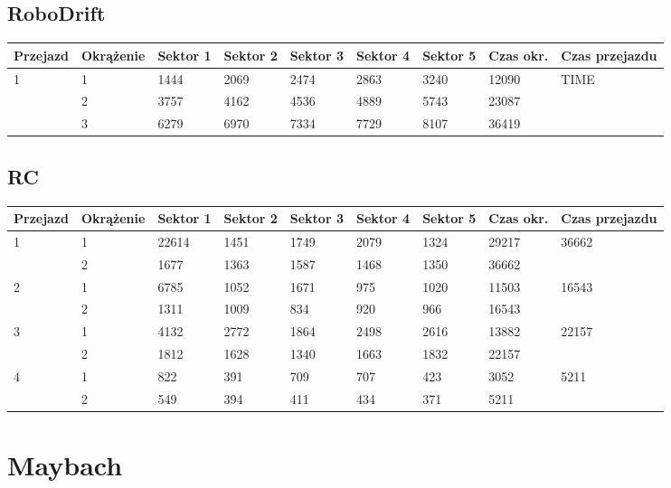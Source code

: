 \documentclass[11pt]{article}
\begin{document}
\subsection{RoboDrift}
\begin{table}[h]
\begin{tabular}{|l|l|l|l|l|l|l|l|l|}
\hline
   Przejazd        & Okrążenie & Sektor 1 & Sektor 2 & Sektor 3 & Sektor 4 & Sektor 5 & Czas okr. & Czas przejazdu    \\ \hline
\multirow{3}{*}{1}& 1 &1444& 2069& 2474& 2863& 3240& 12090& \multirow{3}{*}{TIME} \\ \cline{2-8}
& 2& 3757& 4162& 4536& 4889& 5743& 23087& \\ \cline{2-8}
& 3& 6279& 6970& 7334& 7729& 8107& 36419& \\ \hline
\end{tabular}
\end{table}
\subsection{RC}
\begin{table}[h]
\begin{tabular}{|l|l|l|l|l|l|l|l|l|}
\hline
 Przejazd        & Okrążenie & Sektor 1 & Sektor 2 & Sektor 3 & Sektor 4 & Sektor 5 & Czas okr. & Czas przejazdu    \\ \hline
\multirow{2}{*}{1}& 1 &22614& 1451& 1749& 2079& 1324& 29217& \multirow{2}{*}{36662} \\ \cline{2-8}
& 2& 1677& 1363& 1587& 1468& 1350& 36662& \\ \hline
\multirow{2}{*}{2}& 1 &6785& 1052& 1671& 975& 1020& 11503& \multirow{2}{*}{16543} \\ \cline{2-8}
& 2& 1311& 1009& 834& 920& 966& 16543& \\ \hline
\multirow{2}{*}{3}& 1 &4132& 2772& 1864& 2498& 2616& 13882& \multirow{2}{*}{22157} \\ \cline{2-8}
& 2& 1812& 1628& 1340& 1663& 1832& 22157& \\ \hline
\multirow{2}{*}{4}& 1 &822& 391& 709& 707& 423& 3052& \multirow{2}{*}{5211} \\ \cline{2-8}
& 2& 549& 394& 411& 434& 371& 5211& \\ \hline
\end{tabular}
\end{table}
\pagebreak
\section{Maybach}
\end{document}
